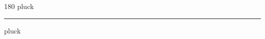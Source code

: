 
\begin{frame}
\begin{center}
\begin{turn}{180}
{\fontsize{2.5cm}{1em}\selectfont pluck}
\end{turn}
\vspace{1em}\par  
\hrule
\vspace{1em}\par  
{\fontsize{2.5cm}{1em}\selectfont pluck}
\end{center}
\end{frame}
